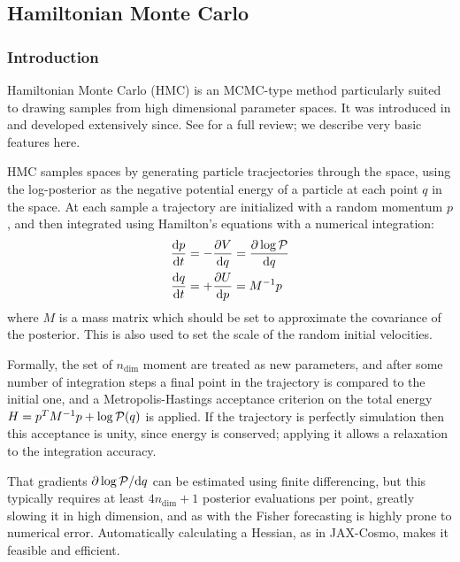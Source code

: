 \documentclass[final,5p,times,twocolumn,authoryear]{elsarticle}
\begin{document}
\subsection{Hamiltonian Monte Carlo}

\subsubsection{Introduction}

Hamiltonian Monte Carlo (HMC) is an MCMC-type method particularly suited to drawing
samples from high dimensional parameter spaces.  It was introduced in \citep{1987PhLB..195..216D}
and developed extensively since.  See \citet{betancourt} for a full review; we describe
very basic features here.

HMC samples spaces by generating particle tracjectories through the space, using the log-posterior
as the negative potential energy of a particle at each point $q$ in the space.  At each sample a trajectory are initialized
with a random momentum $p$, and then integrated using Hamilton's equations with a numerical integration:
\begin{align}
\frac{\mathrm{d}p}{\mathrm{d}t} &= - \frac{\partial V}{\mathrm{d} q} = \frac{\partial \log{\cal P}}{\mathrm{d} q}\\
\frac{\mathrm{d}q}{\mathrm{d}t} &= + \frac{\partial U}{\mathrm{d} p} = M^{-1} p
\end{align}
where $M$ is a mass matrix which should be set to approximate the covariance of the posterior. This is also
used to set the scale of the random initial velocities.

Formally, the set of $n_\mathrm{dim}$ moment are treated as new parameters, and after 
some number of integration steps a final point in the trajectory is compared to the initial one,
and a Metropolis-Hastings acceptance criterion on the total energy $H = p^T M^{-1} p + \log{\cal P}(q)$ is applied.
If the trajectory is perfectly simulation then this acceptance is unity, since energy is conserved; applying it allows
a relaxation to the integration accuracy.

That gradients $\partial \log{\cal P} / \mathrm{d} q$ can be estimated using finite differencing,
but this typically requires at least $4 n_{\mathrm{dim}} + 1$ posterior evaluations per point, greatly slowing it
in high dimension, and as with the Fisher forecasting is highly prone to numerical error. Automatically
calculating a Hessian, as in JAX-Cosmo, makes it feasible and efficient.
\end{document}
